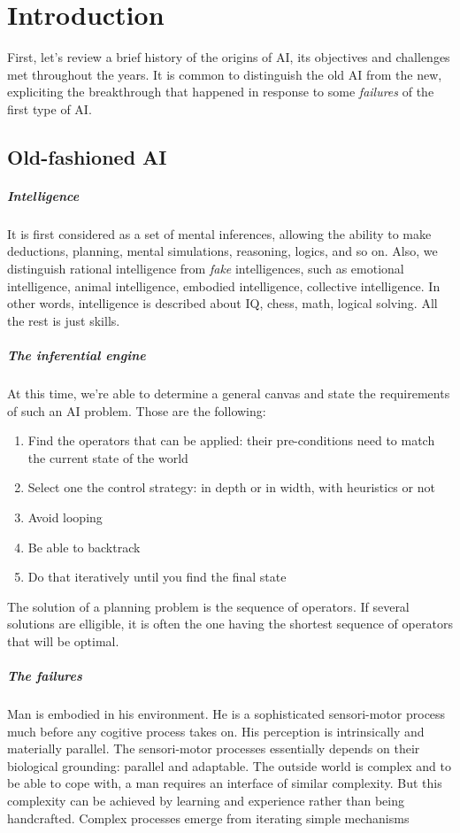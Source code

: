 \chapter{Introduction}
First, let's review a brief history of the origins of AI, its objectives and challenges met throughout the years. It is common to distinguish the old AI from the new, expliciting the breakthrough that happened in response to some \textit{failures} of the first type of AI.

\section{Old-fashioned AI}
\paragraph{Intelligence} It is first considered as a set of mental inferences, allowing the ability to make deductions, planning, mental simulations, reasoning, logics, and so on. Also, we distinguish rational intelligence from \textit{fake} intelligences, such as emotional intelligence, animal intelligence, embodied intelligence, collective intelligence. 
In other words, intelligence is described about IQ, chess, math, logical solving. All the rest is just skills.

\paragraph{The inferential engine} At this time, we're able to determine a general canvas and state the requirements of such an AI problem. Those are the following:
\begin{enumerate}
    \item Find the operators that can be applied: their pre-conditions need to match the current state of the world
    \item Select one the control strategy: in depth or in width, with heuristics or not
    \item Avoid looping
    \item Be able to backtrack
    \item Do that iteratively until you find the final state
\end{enumerate}
The solution of a planning problem is the sequence of operators. If several solutions are elligible, it is often the one having the shortest sequence of operators that will be optimal.


\paragraph{The failures} Man is embodied in his environment. He is a sophisticated sensori-motor process much before any cogitive process takes on. His perception is intrinsically and materially parallel. The sensori-motor processes essentially depends on
their biological grounding: parallel and adaptable.
The outside world is complex and to be able to cope with, a man requires an interface of similar complexity. But this complexity can be achieved by learning and experience rather than being handcrafted. Complex processes emerge from iterating simple mechanisms

